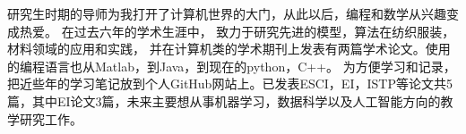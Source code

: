\cvsection{}


\begin{cvparagraph}
研究生时期的导师为我打开了计算机世界的大门，从此以后，编程和数学从兴趣变成热爱。
在过去六年的学术生涯中， 致力于研究先进的模型，算法在纺织服装，材料领域的应用和实践，
并在计算机类的学术期刊上发表有两篇学术论文。使用的编程语言也从Matlab，到Java，到现在的python，C++。 
为方便学习和记录，把近些年的学习笔记放到个人GitHub网站上。已发表ESCI，EI，ISTP等论文共5篇，其中EI论文3篇，未来主要想从事机器学习，数据科学以及人工智能方向的教学研究工作。
\end{cvparagraph}

